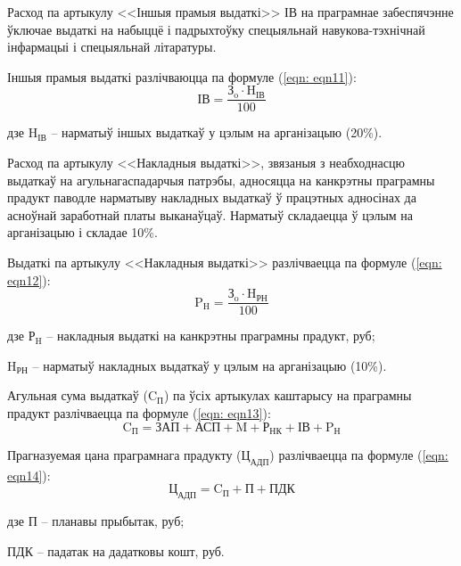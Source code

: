 Расход па артыкулу <<Іншыя прамыя выдаткі>> $\text{ІВ}$ на праграмнае забеспячэнне ўключае выдаткі на набыццё і падрыхтоўку спецыяльнай навукова-тэхнічнай інфармацыі і спецыяльнай літаратуры.

Іншыя прамыя выдаткі разлічваюцца па формуле (\ref{eqn: eqn11}):
\begin{equation}
    \label{eqn: eqn11}
    \text{ІВ} = \frac{\text{З}_\text{o} \cdot \text{H}_\text{ІВ}}{100}
\end{equation}
\begin{Explanation}
    \item[дзе] $\text{H}_\text{ІВ}$ -- нарматыў іншых выдаткаў у цэлым на арганізацыю (20\%).
\end{Explanation}

Расход па артыкулу <<Накладныя выдаткі>>, звязаныя з неабходнасцю
выдаткаў на агульнагаспадарчыя патрэбы, адносяцца на канкрэтны праграмны прадукт
паводле нарматыву накладных выдаткаў ў працэтных адносінах да асноўнай заработнай платы выканаўцаў. Нарматыў складаецца ў цэлым на арганізацыю і складае 10\%.

Выдаткі па артыкулу <<Накладныя выдаткі>> разлічваецца па формуле (\ref{eqn: eqn12}):
\begin{equation}
    \label{eqn: eqn12}
    \text{P}_\text{H} = \frac{\text{З}_\text{o} \cdot \text{H}_\text{РН}}{100}
\end{equation}
\begin{Explanation}
    \item[дзе] $\text{Р}_\text{H}$ -- накладныя выдаткі на канкрэтны праграмны прадукт, руб;
    \item $\text{H}_\text{РН}$ -- нарматыў накладных выдаткаў у цэлым на арганізацыю (10\%).
\end{Explanation}

Агульная сума выдаткаў ($\text{C}_\text{П}$) па ўсіх артыкулах каштарысу на праграмны прадукт разлічваецца па формуле (\ref{eqn: eqn13}):
\begin{equation}
    \label{eqn: eqn13}
    \text{C}_\text{П} = \text{ЗАП} + \text{АСП} + \text{M}
    + \text{Р}_\text{НК} + \text{ІВ} + \text{P}_\text{Н}
\end{equation}

Прагназуемая цана праграмнага прадукту ($\text{Ц}_\text{АДП}$) разлічваецца па формуле (\ref{eqn: eqn14}):
\begin{equation}
    \label{eqn: eqn14}
    \text{Ц}_\text{АДП} = \text{C}_\text{П} + \text{П} + \text{ПДК}
\end{equation}
\begin{Explanation}
    \item[дзе] $\text{П}$ -- планавы прыбытак, руб;
    \item ПДК -- падатак на дадатковы кошт, руб.
\end{Explanation}


